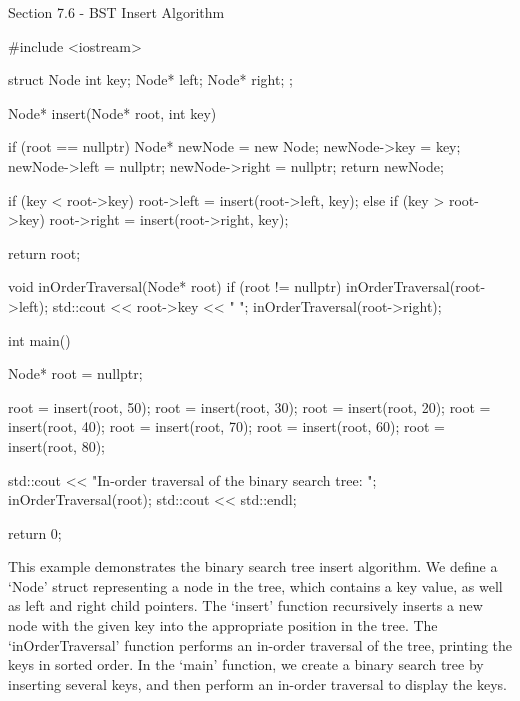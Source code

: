 \begin{notes}{Section 7.6 - BST Insert Algorithm}
\begin{highlight}
    \begin{code}[C++]
    #include <iostream>
    
    struct Node {
        int key;
        Node* left;
        Node* right;
    };
    
    Node* insert(Node* root, int key) {
        if (root == nullptr) {
            Node* newNode = new Node;
            newNode->key = key;
            newNode->left = nullptr;
            newNode->right = nullptr;
            return newNode;
        }
    
        if (key < root->key) {
            root->left = insert(root->left, key);
        } else if (key > root->key) {
            root->right = insert(root->right, key);
        }
    
        return root;
    }
    
    void inOrderTraversal(Node* root) {
        if (root != nullptr) {
            inOrderTraversal(root->left);
            std::cout << root->key << " ";
            inOrderTraversal(root->right);
        }
    }
    
    int main() {
        Node* root = nullptr;
    
        root = insert(root, 50);
        root = insert(root, 30);
        root = insert(root, 20);
        root = insert(root, 40);
        root = insert(root, 70);
        root = insert(root, 60);
        root = insert(root, 80);
    
        std::cout << "In-order traversal of the binary search tree: ";
        inOrderTraversal(root);
        std::cout << std::endl;
    
        return 0;
    }
    \end{code}
        This example demonstrates the binary search tree insert algorithm. We define a `Node' struct representing a node in the tree, which contains a key value, as well as left and right child pointers. The `insert' function recursively inserts a new node with the given key into the appropriate position in the tree. The `inOrderTraversal' 
        function performs an in-order traversal of the tree, printing the keys in sorted order. In the `main' function, we create a binary search tree by inserting several keys, and then perform an in-order traversal to display the keys.
    \end{highlight}
\end{notes}

